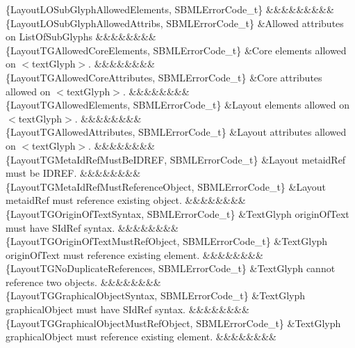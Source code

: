 \begin{DoxyParagraph}{}
\begin{longtabu}
\{Layout\+L\+O\+Sub\+Glyph\+Allowed\+Elements, S\+B\+M\+L\+Error\+Code\+\_\+t\} &&&&&&&&&\\
\{Layout\+L\+O\+Sub\+Glyph\+Allowed\+Attribs, S\+B\+M\+L\+Error\+Code\+\_\+t\} &Allowed attributes on List\+Of\+Sub\+Glyphs &&&&&&&&\\
\{Layout\+T\+G\+Allowed\+Core\+Elements, S\+B\+M\+L\+Error\+Code\+\_\+t\} &Core elements allowed on {\ttfamily $<$text\+Glyph$>$}. &&&&&&&&\\
\{Layout\+T\+G\+Allowed\+Core\+Attributes, S\+B\+M\+L\+Error\+Code\+\_\+t\} &Core attributes allowed on {\ttfamily $<$text\+Glyph$>$}. &&&&&&&&\\
\{Layout\+T\+G\+Allowed\+Elements, S\+B\+M\+L\+Error\+Code\+\_\+t\} &Layout elements allowed on {\ttfamily $<$text\+Glyph$>$}. &&&&&&&&\\
\{Layout\+T\+G\+Allowed\+Attributes, S\+B\+M\+L\+Error\+Code\+\_\+t\} &Layout attributes allowed on {\ttfamily $<$text\+Glyph$>$}. &&&&&&&&\\
\{Layout\+T\+G\+Meta\+Id\+Ref\+Must\+Be\+I\+D\+R\+EF, S\+B\+M\+L\+Error\+Code\+\_\+t\} &Layout \textquotesingle{}metaid\+Ref\textquotesingle{} must be I\+D\+R\+EF. &&&&&&&&\\
\{Layout\+T\+G\+Meta\+Id\+Ref\+Must\+Reference\+Object, S\+B\+M\+L\+Error\+Code\+\_\+t\} &Layout \textquotesingle{}metaid\+Ref\textquotesingle{} must reference existing object. &&&&&&&&\\
\{Layout\+T\+G\+Origin\+Of\+Text\+Syntax, S\+B\+M\+L\+Error\+Code\+\_\+t\} &Text\+Glyph \textquotesingle{}origin\+Of\+Text\textquotesingle{} must have S\+Id\+Ref syntax. &&&&&&&&\\
\{Layout\+T\+G\+Origin\+Of\+Text\+Must\+Ref\+Object, S\+B\+M\+L\+Error\+Code\+\_\+t\} &Text\+Glyph \textquotesingle{}origin\+Of\+Text\textquotesingle{} must reference existing element. &&&&&&&&\\
\{Layout\+T\+G\+No\+Duplicate\+References, S\+B\+M\+L\+Error\+Code\+\_\+t\} &Text\+Glyph cannot reference two objects. &&&&&&&&\\
\{Layout\+T\+G\+Graphical\+Object\+Syntax, S\+B\+M\+L\+Error\+Code\+\_\+t\} &Text\+Glyph \textquotesingle{}graphical\+Object\textquotesingle{} must have S\+Id\+Ref syntax. &&&&&&&&\\
\{Layout\+T\+G\+Graphical\+Object\+Must\+Ref\+Object, S\+B\+M\+L\+Error\+Code\+\_\+t\} &Text\+Glyph \textquotesingle{}graphical\+Object\textquotesingle{} must reference existing element. &&&&&&&&\\

\end{longtabu}
\end{DoxyParagraph}
